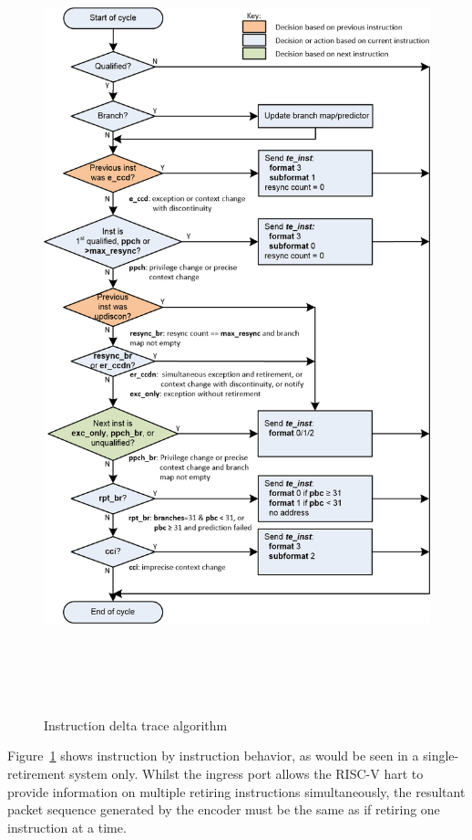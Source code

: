 \begin{figure}
\begin{center}
  \includegraphics[height=23cm, width=15cm]{algo.png}
  \caption{Instruction delta trace algorithm}
  \label{fig:algo}
\end{center}
\end{figure}

Figure~\ref{fig:algo} shows instruction by instruction behavior, as would be
seen in a single-retirement system only.  Whilst the ingress port allows the RISC-V hart to
provide information on multiple retiring instructions simultaneously, the resultant packet
sequence generated by the encoder must be the same as if retiring one instruction at a time.

